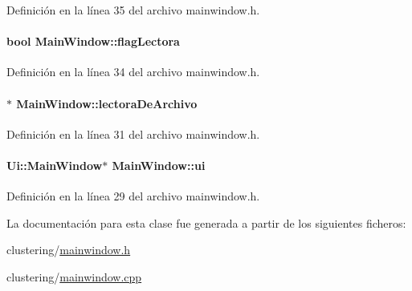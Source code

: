 Definición en la línea 35 del archivo mainwindow.\-h.

\hypertarget{class_main_window_a40ea4c12346500b727bb1b56647d0b9b}{
\paragraph[{flag\-Lectora}]{\setlength{\rightskip}{0pt plus 5cm}bool Main\-Window\-::flag\-Lectora\hspace{0.3cm}{\ttfamily [private]}}}\label{class_main_window_a40ea4c12346500b727bb1b56647d0b9b}


Definición en la línea 34 del archivo mainwindow.\-h.

\hypertarget{class_main_window_acf9c9d69b2ad41d7d536f08c5e39dd15}{
\paragraph[{lectora\-De\-Archivo}]{$\ast$ Main\-Window\-::lectora\-De\-Archivo\hspace{0.3cm}{\ttfamily [private]}}}\label{class_main_window_acf9c9d69b2ad41d7d536f08c5e39dd15}


Definición en la línea 31 del archivo mainwindow.\-h.

\hypertarget{class_main_window_a35466a70ed47252a0191168126a352a5}{
\paragraph[{ui}]{\setlength{\rightskip}{0pt plus 5cm}Ui\-::\-Main\-Window$\ast$ Main\-Window\-::ui\hspace{0.3cm}{\ttfamily [private]}}}\label{class_main_window_a35466a70ed47252a0191168126a352a5}


Definición en la línea 29 del archivo mainwindow.\-h.



La documentación para esta clase fue generada a partir de los siguientes ficheros\-:\begin{DoxyCompactItemize}
\item 
clustering/\hyperlink{mainwindow_8h}{mainwindow.\-h}\item 
clustering/\hyperlink{mainwindow_8cpp}{mainwindow.\-cpp}\end{DoxyCompactItemize}
